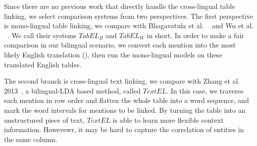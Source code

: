 Since there are no previous work that directly handle the cross-lingual table linking,
we select comparison systems from two perspectives.
The first perspective is mono-lingual table linking,
we compare with Bhagavatula et al. ~
and Wu et al. ~.
We call their systems $TabEL_B$ and $TabEL_W$ in short.
In order to make a fair comparison in our bilingual scenario,
we convert each mention into the most likely English translation (),
then run the mono-lingual models on these translated English tables.%

The second branch is cross-lingual text linking,
we compare with Zhang et al. 2013~,
a bilingual-LDA based method, called $TextEL$.
In this case, we traverse each mention in row order and flatten the whole table into a word sequence,
and mark the word intervals for mentions to be linked. 
By turning the table into an unstructured piece of text,
$TextEL$ is able to learn more flexible context information.
Howevewr, it may be hard to capture the correlation of entities in the 
same column.
